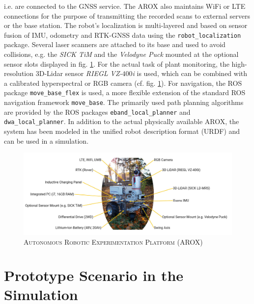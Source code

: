 \documentclass[english, master, utf8]{base/thesis_KBS}
\newcommand{\code}[1]{\colorbox{light-gray}{\texttt{#1}}}
\begin{document}
i.e. are connected to the GNSS service. The AROX also maintains WiFi or LTE connections for the purpose of transmitting the recorded scans to external servers or the base station.
The robot's localization is multi-layered and based on sensor fusion of IMU, odometry and RTK-GNSS data using the \code{robot\_localization} \cite{Moore:2014} package.
Several laser scanners are attached to its base and used to avoid collisions, e.g. the \textit{SICK TiM} and the \textit{Velodyne Puck} mounted at the optional sensor
slots displayed in fig. \ref{fig:arox_system}. For the actual task of plant monitoring, the high-resolution 3D-Lidar sensor \textit{RIEGL VZ-$400$i} is used,
which can be combined with a calibrated hyperspectral or RGB camera (cf. fig. \ref{fig:arox_system}). \cite{Kisliuk:2021}
For navigation, the ROS package \code{move\_base\_flex} \cite{Puetz:2018} is used, a more flexible extension of the standard ROS navigation framework \code{move\_base}.
The primarily used path planning algorithms are provided by the ROS packages \code{eband\_local\_planner} and \code{dwa\_local\_planner}.
In addition to the actual physically available AROX, the system has been modeled in the unified robot description format (URDF) and can be used in a simulation.
\begin{figure}[H]
    \centering
    \includegraphics[width=\textwidth]{pics/AROX.jpg}
    \caption{\textsc{Autonomous Robotic Experimentation Platform (AROX)}}
    \label{fig:arox_system}
\end{figure}

\pagebreak

\section{Prototype Scenario in the Simulation}
\label{sec:prototype_scenario}
\end{document}
